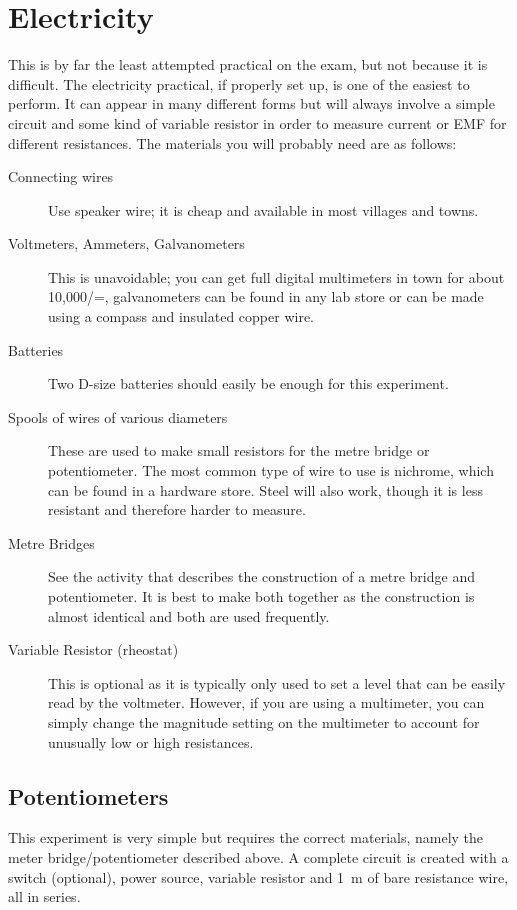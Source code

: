 \section{Electricity}

This is by far the least attempted practical on the exam, but not because it is
difficult. The electricity practical, if properly set up, is one of the easiest to perform. It
can appear in many different forms but will always involve a simple circuit and some
kind of variable resistor in order to measure current or EMF for different resistances. The
materials you will probably need are as follows:

\begin{description}
\item[Connecting wires]{Use speaker wire; it is cheap and available in most villages
and towns.}
\item[Voltmeters, Ammeters, Galvanometers]{This is unavoidable; you can get full
digital multimeters in town for about 10,000/=, galvanometers can be found in
any lab store or can be made using a compass and insulated copper wire.}
\item[Batteries]{Two D-size batteries should easily be enough for this experiment.}
\item[Spools of wires of various diameters]{These are used to make small resistors for
the metre bridge or potentiometer. The most common type of wire to use is
nichrome, which can be found in a hardware store. Steel will also work, though it
is less resistant and therefore harder to measure.}
\item[Metre Bridges]{See the activity that describes the construction of a metre bridge
and potentiometer. It is best to make both together as the construction is almost
identical and both are used frequently.}
\item[Variable Resistor (rheostat)]{This is optional as it is typically only used to set a
level that can be easily read by the voltmeter. However, if you are using a
multimeter, you can simply change the magnitude setting on the multimeter to
account for unusually low or high resistances.}
\end{description}

\subsection{Potentiometers}

This experiment is very simple but requires the correct materials, namely the
meter bridge/potentiometer described above. A complete circuit is created with a switch
(optional), power source, variable resistor and 1~m of bare resistance wire, all in series.

